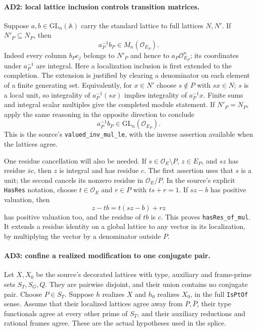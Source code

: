 \paragraph{AD2: local lattice inclusion controls transition matrices.}
Suppose $a,b\in\mathrm{GL}_n(\mathbb A)$ carry the standard
lattice to full lattices $N,N'$. If $N'_P\subseteq N_P$, then
\[
                      a_P^{-1}b_P\in M_n(\mathcal O_{E_P}).
                                                               \tag{AD.6}
\]
Indeed every column $b_Pe_j$ belongs to $N'_P$ and hence to
$a_P\mathcal O_{E_P}^n$; its coordinates under $a_P^{-1}$
are integral. Here a localization inclusion is first extended
to the completion. The extension is justified by clearing a
denominator on each element of a finite generating set.
Equivalently, for $x\in N'$ choose $s\notin P$ with
$sx\in N$; $s$ is a local unit, so integrality of
$a_P^{-1}(sx)$ implies integrality of $a_P^{-1}x$.
Finite sums and integral scalar multiples give the completed
module statement. If $N'_P=N_P$, apply the same reasoning in
the opposite direction to conclude
\[
                      a_P^{-1}b_P\in\mathrm{GL}_n(\mathcal O_{E_P}).
                                                               \tag{AD.7}
\]
This is the source's \texttt{valued\_inv\_mul\_le}, with the
inverse assertion available when the lattices agree.

One residue cancellation will also be needed. If $s\in\mathcal O_E
\setminus P$, $z\in E_P$, and $sz$ has residue $\bar s c$,
then $z$ is integral and has residue $c$. The first assertion
uses that $s$ is a unit; the second cancels its nonzero residue
in $\mathcal O_E/P$. In the source's explicit \texttt{HasRes}
notation, choose $t\in\mathcal O_E$ and $r\in P$ with
$ts+r=1$. If $sz-b$ has positive valuation, then
\[
             z-tb=t(sz-b)+rz                         \tag{AD.8}
\]
has positive valuation too, and the residue of $tb$ is $c$.
This proves \texttt{hasRes\_of\_mul}. It extends a residue
identity on a global lattice to any vector in its localization,
by multiplying the vector by a denominator outside $P$.

\paragraph{AD3: confine a realized modification to one conjugate pair.}
Let $X,X_0$ be the source's decorated lattices with type, auxiliary
and frame-prime sets $S_T,S_G,Q$. They are pairwise disjoint,
and their union contains no conjugate pair. Choose $P\in S_T$.
Suppose $h$ realizes $X$ and $h_0$ realizes $X_0$, in the full
\texttt{IsPtOf} sense. Assume that their localized lattices agree
away from $P,\bar P$, their type functionals agree at every
other prime of $S_T$, and their auxiliary reductions and rational
frames agree. These are the actual hypotheses used in the splice.

